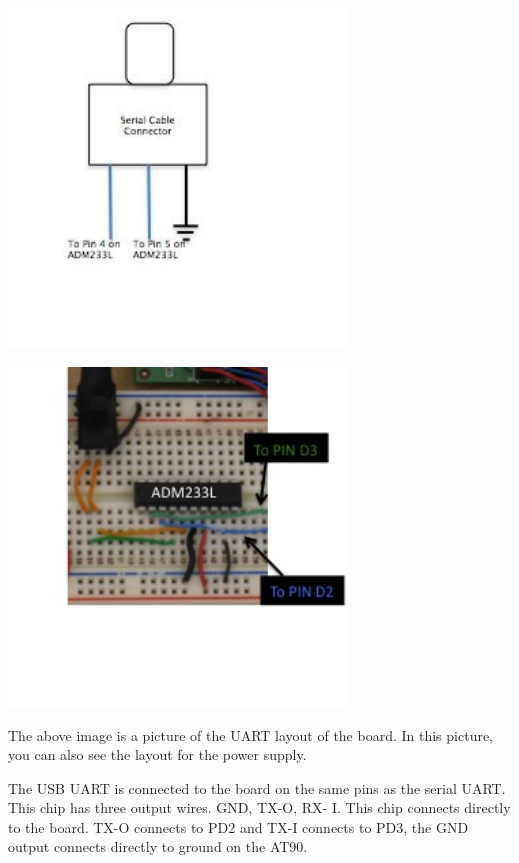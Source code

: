   \begin{minipage}{6.5in}
    \includegraphics[width=90mm]{imageSources/uartConnect2.png}
  \centering
  \label{uartConnect2}
\end{minipage}


  \begin{minipage}{6.5in}
    \includegraphics[width=90mm]{imageSources/uartConnect3.png}
  \centering
  \label{uartConnect3}
\end{minipage}

The above image is a picture of the UART layout of the board. In this picture, you can also see the layout for the power supply.

The USB UART is connected to the board on the same pins as the serial UART.  This chip has three output wires.  GND, TX-O, RX- I. This chip connects directly to the board. TX-O connects to PD2 and TX-I connects to PD3, the GND output connects directly to ground on the AT90.

